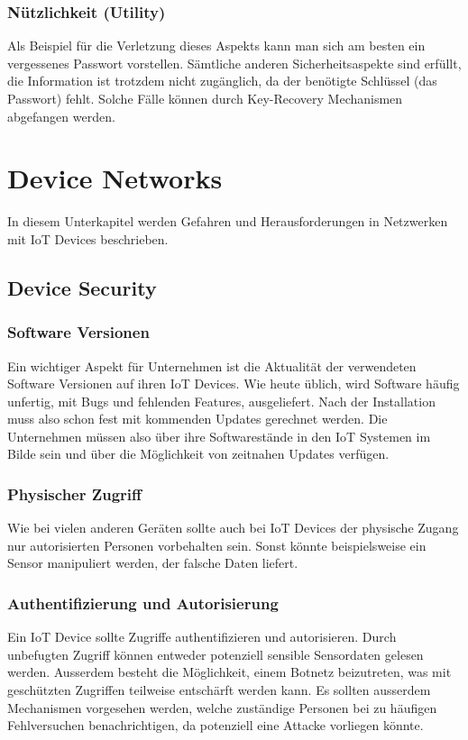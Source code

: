 \subsubsection{Nützlichkeit (Utility)}
Als Beispiel für die Verletzung dieses Aspekts kann man sich am besten ein vergessenes Passwort vorstellen. Sämtliche anderen Sicherheitsaspekte sind erfüllt, die Information ist trotzdem nicht zugänglich, da der benötigte Schlüssel (das Passwort) fehlt. Solche Fälle können durch Key-Recovery Mechanismen abgefangen werden. \cite{ParkerianHexadWiki}
\section{Device Networks}
In diesem Unterkapitel werden Gefahren und Herausforderungen in Netzwerken mit IoT Devices beschrieben.
\subsection{Device Security}
\subsubsection{Software Versionen}
Ein wichtiger Aspekt für Unternehmen ist die Aktualität der verwendeten Software Versionen auf ihren IoT Devices. Wie heute üblich, wird Software häufig unfertig, mit Bugs und fehlenden Features, ausgeliefert. Nach der Installation muss also schon fest mit kommenden Updates gerechnet werden. Die Unternehmen müssen also über ihre Softwarestände in den IoT Systemen im Bilde sein und über die Möglichkeit von zeitnahen Updates verfügen. 

\subsubsection{Physischer Zugriff}
Wie bei vielen anderen Geräten sollte auch bei IoT Devices der physische Zugang nur autorisierten Personen vorbehalten sein. Sonst könnte beispielsweise ein Sensor manipuliert werden, der falsche Daten liefert.

\subsubsection{Authentifizierung und Autorisierung}
Ein IoT Device sollte Zugriffe authentifizieren und autorisieren. Durch unbefugten Zugriff können entweder potenziell sensible Sensordaten gelesen werden. Ausserdem besteht die Möglichkeit, einem Botnetz beizutreten, was mit geschützten Zugriffen teilweise entschärft werden kann. Es sollten ausserdem Mechanismen vorgesehen werden, welche zuständige Personen bei zu häufigen Fehlversuchen benachrichtigen, da potenziell eine Attacke vorliegen könnte.
 
